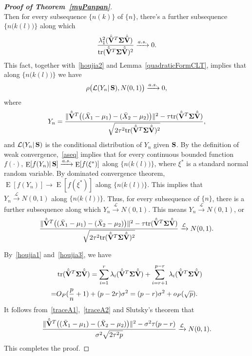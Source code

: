 \documentclass[3p]{elsarticle}
\DeclareMathOperator{\mytr}{tr}
\DeclareMathOperator{\myE}{E}
\theoremstyle{plain}
\theoremstyle{definition}
\theoremstyle{remark}
\begin{document}
\begin{appendices}
\begin{proof}[\textbf{Proof of Theorem~\ref{myPanpan}}]
$$$$
Then for every subsequence $\{n(k)\}$ of $\{n\}$, there's a further subsequence $\big\{n\big(k(l)\big)\big\}$ along which
$$
\frac{\lambda_1^2(\hat{\tilde{\BV}}^T\bSigma\hat{\tilde{\BV}})}{\mytr(\hat{\tilde{\BV}}^T\bSigma\hat{\tilde{\BV}})^2}\xrightarrow{a.s.}0.
$$
This fact, together with~\eqref{houjia2} and Lemma~\ref{quadraticFormCLT}, implies that along $\big\{n\big(k(l)\big)\big\}$ we have
\begin{equation}\label{aseq}
    \rho\big(\mathcal{L}( Y_n |\,\mathbf{S}),N(0,1)\big)\xrightarrow{a.s.}0,
\end{equation}
where 
$$
Y_n=\frac{\|\hat{\tilde{\mathbf{V}}}^T\big((\bar{X}_1-\mu_1)-(\bar{X}_2-\mu_2)\big)\|^2-\tau\mathrm{tr}(\hat{\tilde{\mathbf{V}}}^T\boldsymbol{\Sigma}\hat{\tilde{\mathbf{V}}})}{\sqrt{2\tau^2\mathrm{tr}(\hat{\tilde{\mathbf{V}}}^T\boldsymbol{\Sigma}\hat{\tilde{\mathbf{V}}})^2}},
$$
and $\mathcal{L}(Y_n|\,\mathbf{S})$ is the conditional distribution of $Y_n$ given $\mathbf{S}$.
By the definition of weak convergence,~\eqref{aseq} implies that for every continuous bounded function $f(\cdot)$, $\myE[f(Y_n)|\,\BS]\xrightarrow{a.s.}\myE[f(\xi^*)]$ along $\big\{n\big(k(l)\big)\big\}$, where $\xi^*$ is a standard normal random variable.
By dominated convergence theorem, $\myE[f(Y_n)]\to \myE[f(\xi^*)]$ along $\big\{n\big(k(l)\big)\big\}$.
This implies that $Y_n\xrightarrow{\mathcal{L}}N(0,1)$ along $\big\{n\big(k(l)\big)\big\}$.
Thus, for every subsequence of $\{n\}$, there is a further subsequence along which
$Y_n\xrightarrow{\mathcal{L}}N(0,1)$.
This means $Y_n\xrightarrow{\mathcal{L}}N(0,1)$, or
$$
\frac{\|\hat{\tilde{\mathbf{V}}}^T\big((\bar{X}_1-\mu_1)-(\bar{X}_2-\mu_2)\big)\|^2-\tau\mathrm{tr}(\hat{\tilde{\mathbf{V}}}^T\boldsymbol{\Sigma}\hat{\tilde{\mathbf{V}}})}{\sqrt{2\tau^2\mathrm{tr}(\hat{\tilde{\mathbf{V}}}^T\boldsymbol{\Sigma}\hat{\tilde{\mathbf{V}}})^2}}\xrightarrow{\mathcal{L}}N(0,1).
$$


By~\eqref{houjia1} and~\eqref{houjia3}, we have
\begin{equation}\label{traceA2}
    \begin{aligned}
        &\mytr(\hat{\tilde{\BV}}^T\bSigma\hat{\tilde{\BV}})=
    \sum_{i=1}^r \lambda_i(\hat{\tilde{\BV}}^T\bSigma\hat{\tilde{\BV}})
    +
    \sum_{i=r+1}^{p-r} \lambda_i(\hat{\tilde{\BV}}^T\bSigma\hat{\tilde{\BV}})\\
        =&
    O_P(\frac{p}{n}+1)+(p-2r)\sigma^2
        =
        (p-r)\sigma^2+o_P(\sqrt{p}).
    \end{aligned}
\end{equation}
It follows from~\eqref{traceA1},~\eqref{traceA2} and Slutsky's theorem that
$$
\frac{\|\hat{\tilde{\mathbf{V}}}^T\big((\bar{X}_1-\mu_1)-(\bar{X}_2-\mu_2)\big)\|^2-\sigma^2\tau(p-r) }{\sigma^2\sqrt{2\tau^2 p}}\xrightarrow{\mathcal{L}}N(0,1).
$$
This completes the proof.
\end{proof}

\end{appendices}
\end{document}
